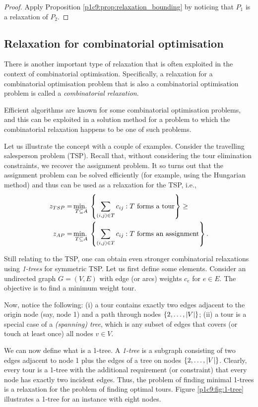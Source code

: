 \begin{proof}
	Apply Proposition \ref{p1c9:prop:relaxation_bounding} by noticing that $P_1$ is a relaxation of $P_2$. 
\end{proof}


\subsection{Relaxation for combinatorial optimisation}

There is another important type of relaxation that is often exploited in the context of combinatorial optimisation. Specifically, a relaxation for a combinatorial optimisation problem that is also a combinatorial optimisation problem is called a \emph{combinatorial relaxation}.

Efficient algorithms are known for some combinatorial optimisation problems, and this can be exploited in a solution method for a problem to which the combinatorial relaxation happens to be one of such problems. 

Let us illustrate the concept with a couple of examples. Consider the travelling salesperson problem (TSP). Recall that, without considering the tour elimination constraints, we recover the assignment problem. It so turns out that the assignment problem can be solved efficiently (for example, using the Hungarian method) and thus can be used as a relaxation for the TSP, i.e.,
%
\begin{align*}
	z_{TSP} = &\mathop{\text{min.~}}_{T\subseteq A}\left\{ \sum_{(i,j)\in T} c_{ij} : T \text{ forms a tour} \right \} \geq \\
	z_{AP} = &\mathop{\text{min.~}}_{T\subseteq A}\left\{ \sum_{(i,j)\in T} c_{ij} : T \text{ forms an assignment} \right \}. 
\end{align*}
%

Still relating to the TSP, one can obtain even stronger combinatorial relaxations using \emph{1-trees} for symmetric TSP. Let us first define some elements.  Consider an undirected graph $G = (V,E)$ with edge (or arcs) weights $c_e$ for $e \in E$. The objective is to find a minimum weight tour.

Now, notice the following: (i) a tour contains exactly two edges adjacent to the origin node (say, node 1) and a path through nodes $\left\{ 2, \dots, |V| \right \}$; (ii) a tour is a special case of a \emph{(spanning) tree}, which is any subset of edges that covers (or touch at least once) all nodes $v \in V$. 

We can now define what is a 1-tree. A \emph{1-tree} is a subgraph consisting of two edges adjacent to node 1 plus the edges of a tree on nodes $\left\{ 2, \dots, |V| \right \}$. Clearly, every tour is a 1-tree with the additional requirement (or constraint) that every node has exactly two incident edges. Thus, the problem of finding minimal 1-trees is a relaxation for the problem of finding optimal tours. Figure \ref{p1c9:fig:1-tree} illustrates a 1-tree for an instance with eight nodes.

